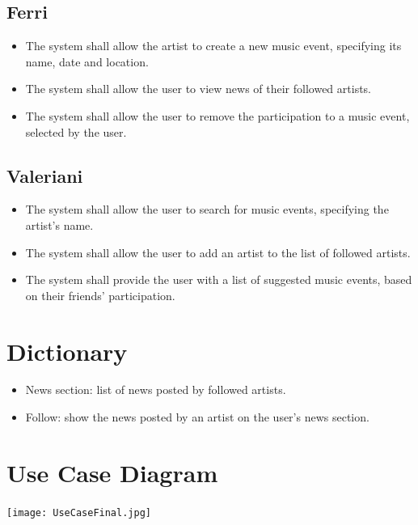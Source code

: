 \documentclass[11pt,a4paper]{article}
\begin{document}
\subsection{Ferri}
\begin{itemize}
\item The system shall allow the artist to create a new music event, specifying its name, date and location.
\item The system shall allow the user to view news of their followed artists.
\item The system shall allow the user to remove the participation to a music event, selected by the user.
\end{itemize}
\subsection{Valeriani}
\begin{itemize}
\item The system shall allow the user to search for music events, specifying the artist’s name.
\item The system shall allow the user to add an artist to the list of followed artists.
\item The system shall provide the user with a list of suggested music events, based on their friends' participation.
\end{itemize}
\section{Dictionary}
\begin{itemize}
\item News section: list of news posted by followed artists.
\item Follow: show the news posted by an artist on the user's news section.
\end{itemize}
\section{Use Case Diagram}
\hspace*{-4cm}  
\texttt{[image: UseCaseFinal.jpg]}
\end{document}
